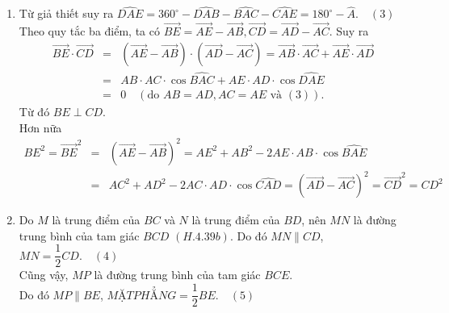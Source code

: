 \begin{bt}
{\begin{enumerate}
{	
			}
			Suy ra $AM\perp DE$.
			\item [b)] Từ giả thiết suy ra $\widehat{DAE}=360^{\circ}-\widehat{DAB}-\widehat{BAC}-\widehat{CAE}=180^{\circ}-\widehat{A}.\quad(3)$\\
			Theo quy tắc ba điểm, ta có $\overrightarrow{BE}=\overrightarrow{AE}-\overrightarrow{AB},\overrightarrow{CD}=\overrightarrow{AD}-\overrightarrow{AC}$. Suy ra \allowdisplaybreaks
			\begin{eqnarray*}
				\overrightarrow{BE}\cdot\overrightarrow{CD}&=&(\overrightarrow{AE}-\overrightarrow{AB})\cdot(\overrightarrow{AD}-\overrightarrow{AC})=\overrightarrow{AB}\cdot\overrightarrow{AC}+\overrightarrow{AE}\cdot\overrightarrow{AD}\\
				&=&AB\cdot AC\cdot\cos\widehat{BAC}+AE\cdot AD\cdot\cos\widehat{DAE}\\
				&=& 0\quad \left(\text{do }AB=AD,AC=AE\text{ và }(3)\right).
			\end{eqnarray*}
			Từ đó $BE\perp CD$.\\
			Hơn nữa \allowdisplaybreaks
			\begin{eqnarray*}
				BE^2=\overrightarrow{BE}^2&=&(\overrightarrow{AE}-\overrightarrow{AB})^2=AE^2+AB^2-2AE\cdot AB\cdot\cos\widehat{BAE}\\
				&=&AC^2+AD^2-2AC\cdot AD\cdot\cos\widehat{CAD}=(\overrightarrow{AD}-\overrightarrow{AC})^2=\overrightarrow{CD}^2=CD^2
			\end{eqnarray*}
			\item [c)] Do $M$ là trung điểm của $BC$ và $N$ là trung điểm của $BD$, nên $MN$ là đường trung bình của tam giác $BCD$ $(H.4.39b)$.
			\immini
			{
				Do đó $MN\parallel CD$, $MN=\dfrac{1}{2}CD.\quad(4)$\\
				Cũng vậy, $MP$ là đường trung bình của tam giác $BCE$.\\
				Do đó $MP\parallel BE$, $MẶT PHẲNG=\dfrac{1}{2}BE.\quad (5)$\\
}
\end{enumerate}}
\end{bt}
